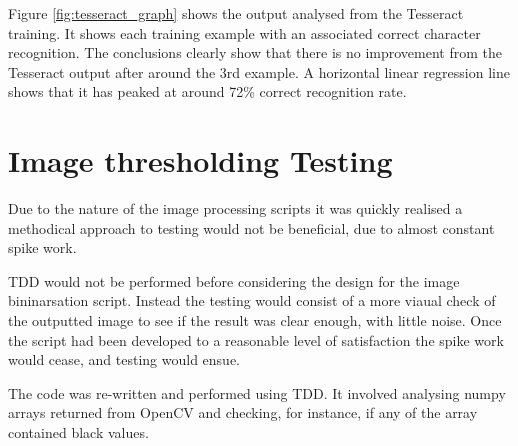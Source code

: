 Figure \ref{fig:tesseract_graph} shows the output analysed from the Tesseract training. It shows each training example with an associated correct character recognition. The conclusions clearly show that there is no improvement from the Tesseract output after around the 3rd example. A horizontal linear regression line shows that it has peaked at around 72\% correct recognition rate.

\section{Image thresholding Testing}
Due to the nature of the image processing scripts it was quickly realised a methodical approach to testing would not be beneficial, due to almost constant spike work.

TDD would not be performed before considering the design for the image bininarsation script. Instead the testing would consist of a more viaual check of the outputted image to see if the result was clear enough, with little noise. Once the script had been developed to a reasonable level of satisfaction the spike work would cease, and testing would ensue.

The code was re-written and performed using TDD. It involved analysing numpy arrays returned from OpenCV and checking, for instance, if any of the array contained black values.

